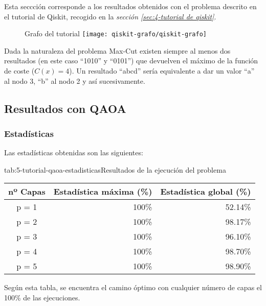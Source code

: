 Esta seccción corresponde a los resultados obtenidos con el problema descrito en el tutorial de Qiskit, recogido en la \textit{sección \ref{sec:4-tutorial de qiskit}}.

\begin{figure}[htbp]{}{Grafo del tutorial}
  \texttt{[image: qiskit-grafo/qiskit-grafo]}
\end{figure}

Dada la naturaleza del problema Max-Cut existen siempre al menos dos resultados (en este caso ``1010'' y ``0101'') que devuelven el máximo de la función de coste (\(C(x) = 4\)).
Un resultado ``abcd'' sería equivalente a dar un valor ``a'' al nodo 3, ``b'' al nodo 2 y así sucesivamente.

\subsection{Resultados con QAOA}

\subsubsection{Estadísticas}

Las estadísticas obtenidas son las siguientes:

\begin{table}[htbp]{tab:5-tutorial-qaoa-estadisticas}{Resultados de la ejecución del problema \cite{qiskit_tutorial_antiguo}}
  \begin{tabular}{|c|r|r|}
    \hline
    \textbf{nº Capas} & \textbf{Estadística máxima (\%)} & \textbf{Estadística global (\%)} \\ \hline
    p = 1             & 100\%                            & 52.14\%                          \\ \hline
    p = 2             & 100\%                            & 98.17\%                          \\ \hline
    p = 3             & 100\%                            & 96.10\%                          \\ \hline
    p = 4             & 100\%                            & 98.70\%                          \\ \hline
    p = 5             & 100\%                            & 98.90\%                          \\ \hline
  \end{tabular}
\end{table}

Según esta tabla, se encuentra el camino óptimo con cualquier número de capas el 100\% de las ejecuciones.

